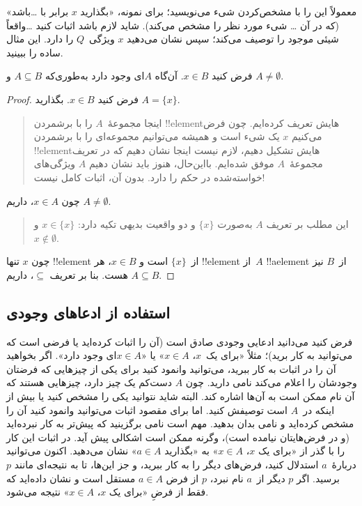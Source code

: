 \documentclass[../../../include/open-logic-section]{subfiles}
\begin{document}
معمولاً این را با مشخص‌کردن شیء می‌نویسید؛ برای نمونه، «بگذارید
$x$ برابر با \dots باشد» (که در آن \dots{} شیء مورد نظر را مشخص
می‌کند). شاید لازم باشد اثبات کنید \dots واقعاً شیئی موجود را توصیف
می‌کند؛ سپس نشان می‌دهید $x$ ویژگی~$Q$ را دارد. این مثال ساده را
ببینید.

\begin{prop}
  فرض کنید $x \in B$. آن‌گاه $A$ای وجود دارد به‌طوری‌که
  $A \subseteq B$ و $A \neq \emptyset$.
\end{prop}

\begin{proof}
  فرض کنید $x \in B$. بگذارید $A = \{x\}$.
  \begin{quote}
    اینجا مجموعهٔ~$A$ را با برشمردن !!{element}هایش تعریف کرده‌ایم.
    چون فرض می‌کنیم $x$ یک شیء است و همیشه می‌توانیم مجموعه‌ای را
    با برشمردن !!{element}هایش تشکیل دهیم، لازم نیست اینجا نشان دهیم
    که در تعریف مجموعهٔ~$A$ موفق شده‌ایم. بااین‌حال، هنوز باید نشان
    دهیم $A$ ویژگی‌های خواسته‌شده در حکم را دارد. بدون آن، اثبات
    کامل نیست!{}
  \end{quote}
  چون $x \in A$، داریم $A \neq \emptyset$.
  \begin{quote}
    این مطلب بر تعریف $A$ به‌صورت $\{x\}$ و دو واقعیت بدیهی تکیه
    دارد: $x \in \{x\}$ و $x \notin \emptyset$.
  \end{quote}
  چون $x$ تنها !!{element} از~$\{x\}$ است و $x \in B$، هر
  !!{element} از~$A$ !!a{element} از~$B$ نیز هست. بنا بر تعریف
  $\subseteq$، داریم $A \subseteq B$.
\end{proof}

\subsection{استفاده از ادعاهای وجودی}

فرض کنید می‌دانید ادعایی وجودی صادق است (آن را اثبات کرده‌اید یا
فرضی است که می‌توانید به کار برید)؛ مثلاً «برای یک~$x$،
$x \in A$» یا «$x \in A$ای وجود دارد». اگر بخواهید آن را در
اثبات به کار ببرید، می‌توانید وانمود کنید برای یکی از چیزهایی که
فرضتان وجودشان را اعلام می‌کند نامی دارید. چون $A$ دست‌کم یک چیز
دارد، چیزهایی هستند که آن نام ممکن است به آن‌ها اشاره کند. البته
شاید نتوانید یکی را مشخص کنید یا بیش از اینکه در~$A$ است توصیفش
کنید. اما برای مقصود اثبات می‌توانید وانمود کنید آن را مشخص کرده‌اید
و نامی بدان بدهید. مهم است نامی برگزینید که پیش‌تر به کار نبرده‌اید
(و در فرض‌هایتان نیامده است)، وگرنه ممکن است اشکالی پیش آید. در
اثبات این کار را با گذر از «برای یک $x$، $x \in A$» به «بگذارید
$a \in A$» نشان می‌دهید. اکنون می‌توانید دربارهٔ~$a$ استدلال کنید،
فرض‌های دیگر را به کار ببرید، و جز این‌ها، تا به نتیجه‌ای مانند
$p$ برسید. اگر $p$ دیگر از~$a$ نام نبرد، $p$ از فرض
$a \in A$ مستقل است و نشان داده‌اید که فقط از فرضِ
«برای یک $x$، $x \in A$» نتیجه می‌شود.
\end{document}
